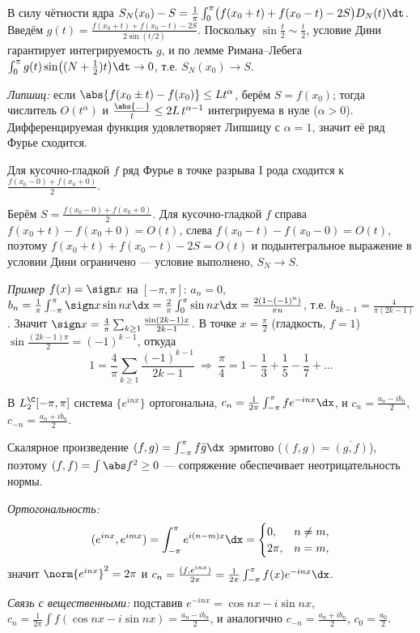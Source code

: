 \dok В силу чётности ядра
$S_N(x_0)-S=\tfrac1\pi\int_0^\pi\bigl(f(x_0+t)+f(x_0-t)-2S\bigr)D_N(t)\dt$. Введём
$g(t)=\tfrac{f(x_0+t)+f(x_0-t)-2S}{2\sin(t/2)}$. Поскольку $\sin\tfrac t2\sim\tfrac t2$, условие Дини
гарантирует интегрируемость $g$, и по лемме Римана–Лебега
$\int_0^\pi g(t)\sin\bigl((N+\tfrac12)t\bigr)\dt\to0$, т.е. $S_N(x_0)\to S$.

\emph{Липшиц:} если
$\abs{f(x_0\pm t)-f(x_0)}\le Lt^\alpha$, берём $S=f(x_0)$; тогда числитель $O(t^\alpha)$ и
$\tfrac{\abs{\dots}}{t}\le2L\,t^{\alpha-1}$ интегрируема в нуле ($\alpha>0$). Дифференцируемая
функция удовлетворяет Липшицу с $\alpha=1$, значит её ряд Фурье сходится.

\stmt Для кусочно-гладкой $f$ ряд Фурье в точке разрыва I рода сходится к
$\tfrac{f(x_0-0)+f(x_0+0)}{2}$.

\dok Берём $S=\tfrac{f(x_0-0)+f(x_0+0)}{2}$. Для кусочно-гладкой $f$ справа
$f(x_0+t)-f(x_0+0)=O(t)$, слева $f(x_0-t)-f(x_0-0)=O(t)$, поэтому $f(x_0+t)+f(x_0-t)-2S=O(t)$ и
подынтегральное выражение в условии Дини ограничено — условие выполнено, $S_N\to S$.

\emph{Пример} $f(x)=\sign x$ на $[-\pi,\pi]$: $a_n=0$,
$b_n=\tfrac1\pi\int_{-\pi}^\pi\sign x\sin nx\dx=\tfrac2\pi\int_0^\pi\sin nx\dx=\tfrac{2(1-(-1)^n)}{\pi n}$,
т.е. $b_{2k-1}=\tfrac{4}{\pi(2k-1)}$. Значит
$\sign x=\tfrac4\pi\sum_{k\ge1}\tfrac{\sin(2k-1)x}{2k-1}$. В точке $x=\tfrac\pi2$ (гладкость, $f=1$)
$\sin\tfrac{(2k-1)\pi}2=(-1)^{k-1}$, откуда
\[
  1=\frac4\pi\sum_{k\ge1}\frac{(-1)^{k-1}}{2k-1}\ \Rightarrow\
  \frac\pi4=1-\frac13+\frac15-\frac17+\dots
\]

\stmt В $L_2^{\C}[-\pi,\pi]$ система $\{e^{inx}\}$ ортогональна, $c_n=\tfrac1{2\pi}\int_{-\pi}^\pi
f e^{-inx}\dx$, и $c_n=\tfrac{a_n-ib_n}{2}$, $c_{-n}=\tfrac{a_n+ib_n}{2}$.

\dok Скалярное произведение $(f,g)=\int_{-\pi}^\pi f\bar g\dx$ эрмитово ($(f,g)=\overline{(g,f)}$),
поэтому $(f,f)=\int\abs f^2\ge0$ — сопряжение обеспечивает неотрицательность нормы.

\emph{Ортогональность:}
\[
  (e^{inx},e^{imx})=\int_{-\pi}^\pi e^{i(n-m)x}\dx=
  \begin{cases}0,&n\ne m,\\ 2\pi,&n=m,\end{cases}
\]
значит $\norm{e^{inx}}^2=2\pi$ и $c_n=\tfrac{(f,e^{inx})}{2\pi}=\tfrac1{2\pi}\int_{-\pi}^\pi
f(x)e^{-inx}\dx$.

\emph{Связь с вещественными:} подставив $e^{-inx}=\cos nx-i\sin nx$,
$c_n=\tfrac1{2\pi}\int f(\cos nx-i\sin nx)=\tfrac{a_n-ib_n}{2}$, и аналогично
$c_{-n}=\tfrac{a_n+ib_n}{2}$, $c_0=\tfrac{a_0}{2}$.
